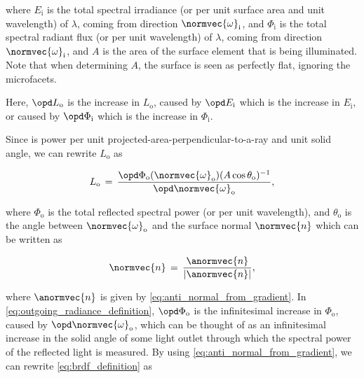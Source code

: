 {where $E_{\text{i}}$ is the total spectral irradiance (or  per unit surface area and unit wavelength) of  $\lambda$, coming from direction $\normvec{\omega}_{\text{i}}$, and $\Phi_{\text{i}}$ is the total spectral radiant flux (or  per unit wavelength) of  $\lambda$, coming from direction $\normvec{\omega}_{\text{i}}$, and $A$ is the area of the surface element that is being illuminated. Note that when determining $A$, the surface is seen as perfectly flat, ignoring the microfacets.

Here, $\opd L_{\text{o}}$ is the \infinitesimal increase in $L_{\text{o}}$, caused by $\opd E_{\text{i}}$ which is the \infinitesimal increase in $E_{\text{i}}$, or caused by $\opd \Phi_{\text{i}}$ which is the \infinitesimal increase in $\Phi_{\text{i}}$. 

Since \radiance is power per unit projected-area-perpendicular-to-a-ray and unit solid angle, we can rewrite $L_{\text{o}}$ as

\begin{equation} \label{eq:outgoing_radiance_definition}
L_{\text{o}} \,=\, \frac{\opd \Phi_{\text{o}}(\normvec{\omega}_{\text{o}})(A\cos\theta_{\text{o}})^{-1}}{\opd \normvec{\omega}_{\text{o}}},
\end{equation}

where $\Phi_{\text{o}}$ is the total reflected spectral power (or  per unit wavelength), and $\theta_{\text{o}}$ is the angle between $\normvec{\omega}_{\text{o}}$ and the surface normal $\normvec{n}$ which can be written as

\begin{equation} \label{eq:normal_from_antinormal}
\normvec{n} \,=\, \frac{\anormvec{n}}{|\anormvec{n}|},
\end{equation}

where $\anormvec{n}$ is given by \eqref{eq:anti_normal_from_gradient}. In \eqref{eq:outgoing_radiance_definition}, $\opd \Phi_{\text{o}}$ is the infinitesimal increase in $\Phi_{\text{o}}$, caused by $\opd \normvec{\omega}_{\text{o}}$, which can be thought of as an infinitesimal increase in the solid angle of some light outlet through which the spectral power of the reflected light is measured. By using \eqref{eq:anti_normal_from_gradient}, we can rewrite \eqref{eq:brdf_definition} as

}

